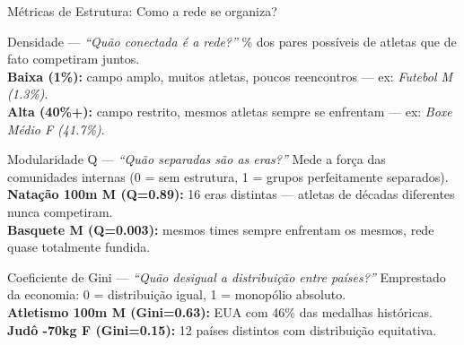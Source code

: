 \begin{frame}[shrink=5]{Métricas de Estrutura: Como a rede se organiza?}

    \begin{block}{Densidade --- \textit{``Quão conectada é a rede?''}}
        \footnotesize
        \% dos pares possíveis de atletas que de fato competiram juntos.\\
        \textbf{Baixa (1\%):} campo amplo, muitos atletas, poucos reencontros --- ex: \textit{Futebol M (1.3\%)}.\\
        \textbf{Alta (40\%+):} campo restrito, mesmos atletas sempre se enfrentam --- ex: \textit{Boxe Médio F (41.7\%)}.
    \end{block}

    \vspace{0.25cm}

    \begin{block}{Modularidade Q \cite{Newman2006Modularity} --- \textit{``Quão separadas são as eras?''}}
        \footnotesize
        Mede a força das comunidades internas (0 = sem estrutura, 1 = grupos perfeitamente separados).\\
        \textbf{Natação 100m M (Q=0.89):} 16 eras distintas --- atletas de décadas diferentes nunca competiram.\\
        \textbf{Basquete M (Q=0.003):} mesmos times sempre enfrentam os mesmos, rede quase totalmente fundida.
    \end{block}

    \vspace{0.25cm}

    \begin{block}{Coeficiente de Gini \cite{Fabbri2022Inequality} --- \textit{``Quão desigual a distribuição entre países?''}}
        \footnotesize
        Emprestado da economia: 0 = distribuição igual, 1 = monopólio absoluto.\\
        \textbf{Atletismo 100m M (Gini=0.63):} EUA com 46\% das medalhas históricas.\\
        \textbf{Judô -70kg F (Gini=0.15):} 12 países distintos com distribuição equitativa.
    \end{block}

\end{frame}
